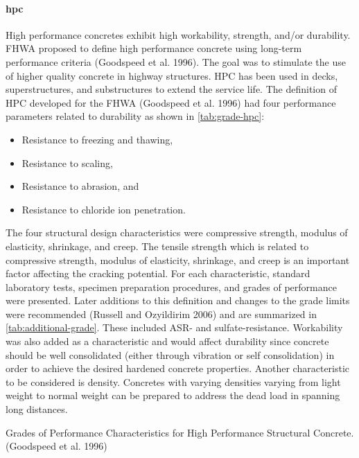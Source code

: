 \paragraph{\acrfull*{hpc}}
High performance concretes exhibit high workability, strength, and/or durability. FHWA proposed to define high performance concrete using long-term performance criteria (Goodspeed et al. 1996). The goal was to stimulate the use of higher quality concrete in highway structures. HPC has been used in decks, superstructures, and substructures to extend the service life. The definition of HPC developed for the FHWA (Goodspeed et al. 1996) had four performance parameters related to durability as shown in \cref{tab:grade-hpc}:

\begin{itemize}
  \item Resistance to freezing and thawing,
  \item Resistance to scaling,
  \item Resistance to abrasion, and
  \item Resistance to chloride ion penetration.
\end{itemize}

The four structural design characteristics were compressive strength, modulus of elasticity, shrinkage, and creep. The tensile strength which is related to compressive strength, modulus of elasticity, shrinkage, and creep is an important factor affecting the cracking potential. For each characteristic, standard laboratory tests, specimen preparation procedures, and grades of performance were presented. Later additions to this definition and changes to the grade limits were recommended (Russell and Ozyildirim 2006) and are summarized in \cref{tab:additional-grade}. These included ASR- and sulfate-resistance. Workability was also added as a characteristic and would affect durability since concrete should be well consolidated (either through vibration or self consolidation) in order to achieve the desired hardened concrete properties. Another characteristic to be considered is density. Concretes with varying densities varying from light weight to normal weight can be prepared to address the dead load in spanning long distances.

\begin{table}
  \caption{Grades of Performance Characteristics for High Performance Structural Concrete. (Goodspeed et al. 1996)}
  \label{tab:grade-hpc}
\end{table}

